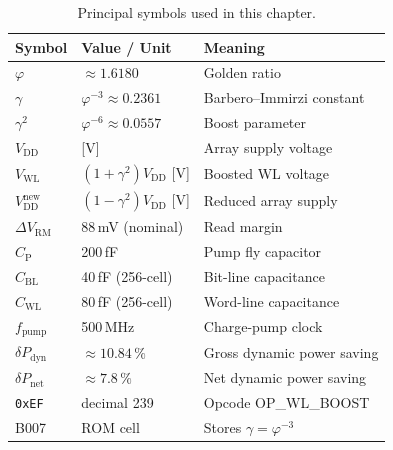 \begin{table}[htbp]
  \centering
  \caption{Principal symbols used in this chapter.}
  \label{tab:symbols}
  \begin{tabular}{lll}
    \hline
    \textbf{Symbol} & \textbf{Value / Unit} & \textbf{Meaning} \\
    \hline
    $\varphi$           & $\approx 1.6180$      & Golden ratio \\
    $\gamma$            & $\varphi^{-3} \approx 0.2361$ & Barbero--Immirzi constant \\
    $\gamma^{2}$        & $\varphi^{-6} \approx 0.0557$ & Boost parameter \\
    $V_{\mathrm{DD}}$   & [V]                  & Array supply voltage \\
    $V_{\mathrm{WL}}$   & $(1+\gamma^{2})V_{\mathrm{DD}}$ [V] & Boosted WL voltage \\
    $V_{\mathrm{DD}}^{\mathrm{new}}$ & $(1-\gamma^{2})V_{\mathrm{DD}}$ [V] & Reduced array supply \\
    $\Delta V_{\mathrm{RM}}$ & 88\,mV (nominal) & Read margin \\
    $C_{\mathrm{P}}$    & 200\,fF              & Pump fly capacitor \\
    $C_{\mathrm{BL}}$   & 40\,fF (256-cell)    & Bit-line capacitance \\
    $C_{\mathrm{WL}}$   & 80\,fF (256-cell)    & Word-line capacitance \\
    $f_{\mathrm{pump}}$ & 500\,MHz             & Charge-pump clock \\
    $\delta P_{\mathrm{dyn}}$ & $\approx 10.84\,\%$ & Gross dynamic power saving \\
    $\delta P_{\mathrm{net}}$ & $\approx 7.8\,\%$   & Net dynamic power saving \\
    \texttt{0xEF}       & decimal 239          & Opcode OP\_WL\_BOOST \\
    B007                & ROM cell             & Stores $\gamma = \varphi^{-3}$ \\
    \hline
  \end{tabular}
\end{table}

